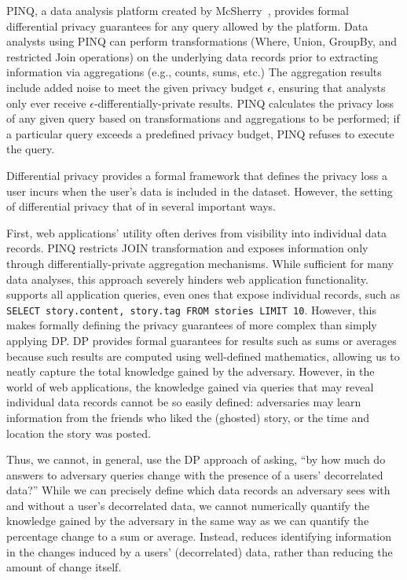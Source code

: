 PINQ, a data analysis platform created by McSherry~\cite{pinq}, provides formal differential privacy
guarantees for any query allowed by the platform.  Data analysts using PINQ can perform
transformations (Where, Union, GroupBy, and restricted Join operations) on the underlying data
records prior to extracting information via aggregations (e.g., counts, sums, etc.) The aggregation
results include added noise to meet the given privacy budget $\epsilon$, ensuring that analysts only
ever receive $\epsilon$-differentially-private results.  PINQ calculates the privacy loss of any
given query based on transformations and aggregations to be performed; if a particular query exceeds
a predefined privacy budget, PINQ refuses to execute the query.

Differential privacy provides a formal framework that defines the privacy loss a user incurs
when the user's data is included in the dataset. However, the setting of differential privacy
that of \sys{} in several important ways. 

First, web applications' utility often derives from visibility into individual data records. PINQ
restricts JOIN transformation and exposes information only through differentially-private
aggregation mechanisms. While sufficient for many data analyses, this approach severely hinders web
application functionality. \sys{} supports all application queries, even ones that expose individual
records, such as \texttt{SELECT story.content, story.tag FROM stories LIMIT 10}.  
However, this makes formally defining the privacy guarantees of \sys{} more complex than
simply applying DP.  DP provides formal guarantees for results such as sums or averages because such
results are computed using well-defined mathematics, allowing us to neatly capture the total
knowledge gained by the adversary. However, in the world of web applications, the knowledge gained
via queries that may reveal individual data records cannot be so easily defined: adversaries may
learn information from the friends who liked the (ghosted) story, or the time and location the story
was posted.

Thus, we cannot, in general, use the DP approach of asking, ``by how much do answers to adversary
queries change with the presence of a users' decorrelated data?'' While we can precisely define which
data records an adversary sees with and without a user's decorrelated data, we cannot numerically
quantify the knowledge gained by the adversary in the same way as we can quantify the percentage
change to a sum or average.
Instead, \sys{} reduces identifying information in the changes induced by a users' (decorrelated)
data, rather than reducing the amount of change itself.

